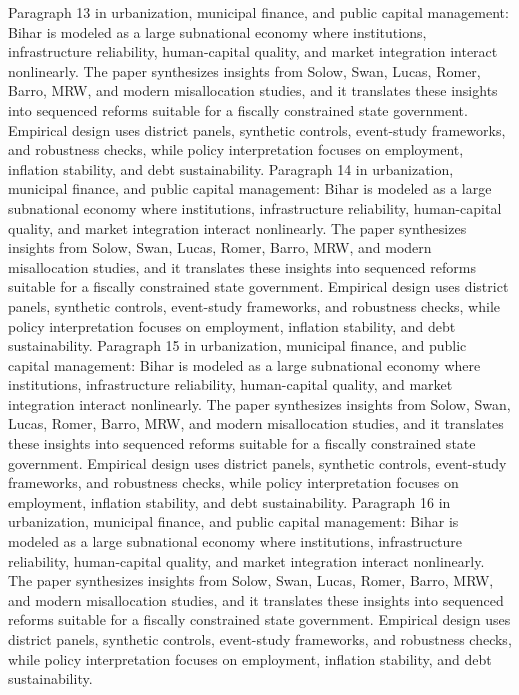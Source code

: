 \documentclass[preprint,12pt]{elsarticle}
\begin{document}
Paragraph 13 in urbanization, municipal finance, and public capital management: Bihar is modeled as a large subnational economy where institutions, infrastructure reliability, human-capital quality, and market integration interact nonlinearly. The paper synthesizes insights from Solow, Swan, Lucas, Romer, Barro, MRW, and modern misallocation studies, and it translates these insights into sequenced reforms suitable for a fiscally constrained state government. Empirical design uses district panels, synthetic controls, event-study frameworks, and robustness checks, while policy interpretation focuses on employment, inflation stability, and debt sustainability.
Paragraph 14 in urbanization, municipal finance, and public capital management: Bihar is modeled as a large subnational economy where institutions, infrastructure reliability, human-capital quality, and market integration interact nonlinearly. The paper synthesizes insights from Solow, Swan, Lucas, Romer, Barro, MRW, and modern misallocation studies, and it translates these insights into sequenced reforms suitable for a fiscally constrained state government. Empirical design uses district panels, synthetic controls, event-study frameworks, and robustness checks, while policy interpretation focuses on employment, inflation stability, and debt sustainability.
Paragraph 15 in urbanization, municipal finance, and public capital management: Bihar is modeled as a large subnational economy where institutions, infrastructure reliability, human-capital quality, and market integration interact nonlinearly. The paper synthesizes insights from Solow, Swan, Lucas, Romer, Barro, MRW, and modern misallocation studies, and it translates these insights into sequenced reforms suitable for a fiscally constrained state government. Empirical design uses district panels, synthetic controls, event-study frameworks, and robustness checks, while policy interpretation focuses on employment, inflation stability, and debt sustainability.
Paragraph 16 in urbanization, municipal finance, and public capital management: Bihar is modeled as a large subnational economy where institutions, infrastructure reliability, human-capital quality, and market integration interact nonlinearly. The paper synthesizes insights from Solow, Swan, Lucas, Romer, Barro, MRW, and modern misallocation studies, and it translates these insights into sequenced reforms suitable for a fiscally constrained state government. Empirical design uses district panels, synthetic controls, event-study frameworks, and robustness checks, while policy interpretation focuses on employment, inflation stability, and debt sustainability.
\end{document}
